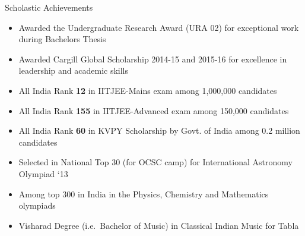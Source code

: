 \documentclass{resume} %
\begin{document}
\vspace*{-8pt}
\begin{rSection}{Scholastic Achievements}
\vspace*{-0.2cm}
\begin{itemize}[leftmargin=*, itemsep=-0.6ex]%
    \item Awarded the Undergraduate Research Award (URA 02) for exceptional work during Bachelors Thesis
    \item Awarded Cargill Global Scholarship 2014-15 and 2015-16 for excellence in leadership and academic skills
    \item All India Rank \textbf{12} in IITJEE-Mains exam among 1,000,000 candidates 
	\item All India Rank \textbf{155} in IITJEE-Advanced exam among 150,000 candidates
    \item All India Rank \textbf{60} in KVPY Scholarship by Govt. of India among 0.2 million candidates
    \item Selected in National Top 30 (for OCSC camp) for International Astronomy Olympiad `13
    \item Among top 300 in India in the Physics, Chemistry and Mathematics olympiads
    \item Visharad Degree (i.e.\ Bachelor of Music) in Classical Indian Music for Tabla

\end{itemize}

\end{rSection}


\end{document}
